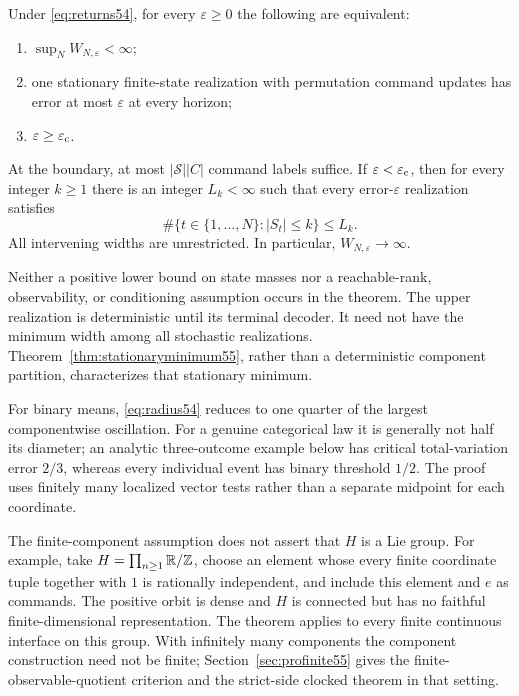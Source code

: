 \begin{theorem}\label{thm:radius54}
Under \eqref{eq:returns54}, for every $\varepsilon\ge0$ the following are equivalent:
\begin{enumerate}
\item $\sup_N W_{N,\varepsilon}<\infty$;
\item one stationary finite-state realization with permutation command updates has error at most $\varepsilon$ at every horizon;
\item $\varepsilon\ge\varepsilon_{\mathrm c}$.
\end{enumerate}
At the boundary, at most $|\mathcal S||C|$ command labels suffice. If $\varepsilon<\varepsilon_{\mathrm c}$, then for every integer $k\ge1$ there is an integer $L_k<\infty$ such that every error-$\varepsilon$ realization satisfies
\begin{equation}\label{eq:occupation54}
 \#\{t\in\{1,\ldots,N\}:|S_t|\le k\}\le L_k.
\end{equation}
All intervening widths are unrestricted. In particular, $W_{N,\varepsilon}\to\infty$.
\end{theorem}
Neither a positive lower bound on state masses nor a reachable-rank, observability, or conditioning assumption occurs in the theorem. The upper realization is deterministic until its terminal decoder. It need not have the minimum width among all stochastic realizations. Theorem~\ref{thm:stationaryminimum55}, rather than a deterministic component partition, characterizes that stationary minimum.

For binary means, \eqref{eq:radius54} reduces to one quarter of the largest componentwise oscillation. For a genuine categorical law it is generally not half its diameter; an analytic three-outcome example below has critical total-variation error $2/3$, whereas every individual event has binary threshold $1/2$. The proof uses finitely many localized vector tests rather than a separate midpoint for each coordinate.

The finite-component assumption does not assert that $H$ is a Lie group. For example, take $H=\prod_{n\ge1}\mathbb R/\mathbb Z$, choose an element whose every finite coordinate tuple together with $1$ is rationally independent, and include this element and $e$ as commands. The positive orbit is dense and $H$ is connected but has no faithful finite-dimensional representation. The theorem applies to every finite continuous interface on this group. With infinitely many components the component construction need not be finite; Section~\ref{sec:profinite55} gives the finite-observable-quotient criterion and the strict-side clocked theorem in that setting.

